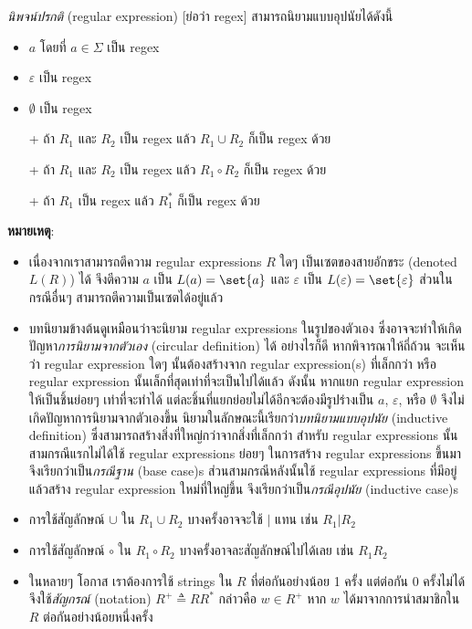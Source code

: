 \begin{definition}
\emph{นิพจน์ปรกติ} (regular expression) [ย่อว่า regex] สามารถนิยามแบบอุปนัยได้ดังนี้
\begin{itemize}
\item $a$ โดยที่ $a\in\Sigma$ เป็น regex
\item $\varepsilon$ เป็น regex
\item $\emptyset$ เป็น regex
\item[+] ถ้า $R_1$ และ $R_2$ เป็น regex แล้ว $R_1\cup R_2$ ก็เป็น regex ด้วย
\item[+] ถ้า $R_1$ และ $R_2$ เป็น regex แล้ว $R_1\circ R_2$ ก็เป็น regex ด้วย
\item[+] ถ้า $R_1$ เป็น regex แล้ว $R_1^*$ ก็เป็น regex ด้วย
\end{itemize}
{\bf หมายเหตุ}:
\begin{itemize}
\item เนื่องจากเราสามารถตีความ regular expressions $R$ ใดๆ เป็นเซตของสายอักขระ (denoted $L(R)$) ได้ จึงตีความ $a$ เป็น $L(a)=\set{a}$ และ $\varepsilon$ เป็น $L(\varepsilon)=\set{\varepsilon}$ \enskip ส่วนในกรณีอื่นๆ สามารถตีความเป็นเซตได้อยู่แล้ว
\item บทนิยามข้างต้นดูเหมือนว่าจะนิยาม regular expressions ในรูปของตัวเอง ซึ่งอาจจะทำให้เกิดปัญหา\emph{การนิยามจากตัวเอง} (circular definition) ได้ \enskip อย่างไรก็ดี หากพิจารณาให้ถี่ถ้วน จะเห็นว่า regular expression ใดๆ นั้นต้องสร้างจาก regular expression(s) ที่เล็กกว่า หรือ regular expression นั้นเล็กที่สุดเท่าที่จะเป็นไปได้แล้ว \enskip ดังนั้น หากแยก regular expression ให้เป็นชิ้นย่อยๆ เท่าที่จะทำได้ แต่ละชิ้นที่แยกย่อยไม่ได้อีกจะต้องมีรูปร่างเป็น $a$, $\varepsilon$, หรือ $\emptyset$ จึงไม่เกิดปัญหาการนิยามจากตัวเองขึ้น \enskip นิยามในลักษณะนี้เรียกว่า\emph{บทนิยามแบบอุปนัย} (inductive definition) ซึ่งสามารถสร้างสิ่งที่ใหญ่กว่าจากสิ่งที่เล็กกว่า \enskip สำหรับ regular expressions นั้น สามกรณีแรกไม่ได้ใช้ regular expressions ย่อยๆ ในการสร้าง regular expressions ขึ้นมา จึงเรียกว่าเป็น\emph{กรณีฐาน} (base case)s ส่วนสามกรณีหลังนั้นใช้ regular expressions ที่มีอยู่แล้วสร้าง regular expression ใหม่ที่ใหญ่ขึ้น จึงเรียกว่าเป็น\emph{กรณีอุปนัย} (inductive case)s
\item การใช้สัญลักษณ์ $\cup$ ใน $R_1\cup R_2$ บางครั้งอาจจะใช้ $|$ แทน เช่น $R_1|R_2$
\item การใช้สัญลักษณ์ $\circ$ ใน $R_1\circ R_2$ บางครั้งอาจละสัญลักษณ์ไปได้เลย เช่น $R_1R_2$
\item ในหลายๆ โอกาส เราต้องการใช้ strings ใน $R$ ที่ต่อกันอย่างน้อย 1 ครั้ง แต่ต่อกัน 0 ครั้งไม่ได้ จึงใช้\emph{สัญกรณ์} (notation) $R^+\triangleq RR^*$ กล่าวคือ $w\in R^+$ หาก $w$ ได้มาจากการนำสมาชิกใน $R$ ต่อกันอย่างน้อยหนึ่งครั้ง
\end{itemize}
\end{definition}
